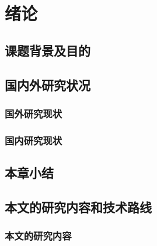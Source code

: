 \documentclass{article}
\begin{document}
    
    \clearpage %
    \thispagestyle{fancy}
    \setcounter{page}{1} %

    \pagestyle{fancy}
    \fancyhf{}
    \rhead{\thistitle}
    \renewcommand{\headrulewidth}{0.4pt}
    

    \clearpage
    \sanhaolineskip
    \section{绪论}
        \subsection{课题背景及目的}
            
        \subsection{国内外研究状况}
            \subsubsection{国外研究现状}
                
            \subsubsection{国内研究现状}
                
        \subsection{本章小结}
            
        \subsection{本文的研究内容和技术路线}
            \subsubsection{本文的研究内容}
                
\end{document}
